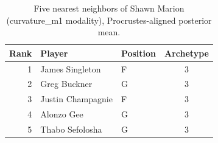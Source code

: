 \begin{table}[htbp]
  \centering\small
  \begin{tabular}{rllc}
    \toprule
    Rank & Player & Position & Archetype \\
    \midrule
    1 & James Singleton & F & 3 \\
    2 & Greg Buckner & G & 3 \\
    3 & Justin Champagnie & F & 3 \\
    4 & Alonzo Gee & G & 3 \\
    5 & Thabo Sefolosha & G & 3 \\
    \bottomrule
  \end{tabular}
  \caption{Five nearest neighbors of Shawn Marion (curvature_m1 modality), Procrustes-aligned posterior mean.}
  \label{tab:Shawn_Marion_neighbors_curvature_m1}
\end{table}

